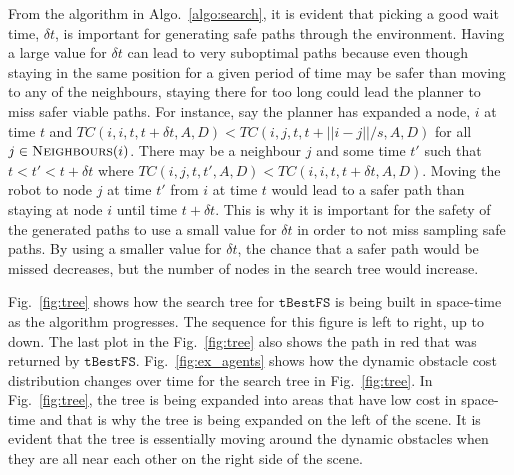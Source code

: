 \documentclass[letterpaper, 10pt, conference]{ieeeconf}
\newcommand{\Acronym}[1]{\ensuremath{{{\texttt{#1}}}}}
\newcommand{\Function}[1]{\ensuremath{{ \textsc{#1}}}}
\begin{document}
From the algorithm in Algo.~\ref{algo:search}, it is evident that picking a
good wait time, $\delta t$, is important for generating safe paths through the
environment. Having a large value for $\delta t$ can lead to very suboptimal
paths because even though staying in the same position for a given period of
time may be safer than moving to any of the neighbours, staying there for too
long could lead the planner to miss safer viable paths. For instance, say the
planner has expanded a node, $i$ at time $t$ and $TC(i, i, t, t + \delta t, A,
D) < TC(i, j, t, t + ||i - j|| / s, A, D)$ for all $j \in
\Function{Neighbours}(i)$. There may be a neighbour $j$ and some time $t'$ such
that $t < t' < t + \delta t$ where $TC(i, j, t, t', A, D) < TC(i, i, t, t +
\delta t, A, D)$. Moving the robot to node $j$ at time $t'$ from $i$ at time
$t$ would lead to a safer path than staying at node $i$ until time $t + \delta
t$. This is why it is important for the safety of the generated paths to use a
small value for $\delta t$ in order to not miss sampling safe paths. By using a
smaller value for $\delta t$, the chance that a safer path would be missed
decreases, but the number of nodes in the search tree would increase.

Fig.~\ref{fig:tree} shows how the search tree for $\Acronym{tBestFS}$ is being
built in space-time as the algorithm progresses. The sequence for this figure
is left to right, up to down. The last plot in the Fig.~\ref{fig:tree} also
shows the path in red that was returned by $\Acronym{tBestFS}$.
Fig.~\ref{fig:ex_agents} shows how the dynamic obstacle cost distribution
changes over time for the search tree in Fig.~\ref{fig:tree}. In
Fig.~\ref{fig:tree}, the tree is being expanded into areas that have low cost
in space-time and that is why the tree is being expanded on the left of the
scene. It is evident that the tree is essentially moving around the dynamic
obstacles when they are all near each other on the right side of the scene.
\end{document}
